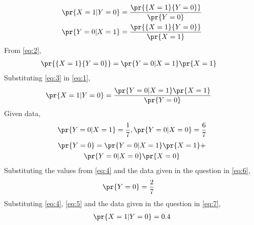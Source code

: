 \begin{align}
    \pr{X = 1|Y = 0}&=\frac{\pr{\{X=1\}\{Y=0\}}}{\pr{Y=0}} \label{eq:1}\\
    \pr{Y = 0|X = 1}&=\frac{\pr{\{X=1\}\{Y=0\}}}{\pr{X=1}} \label{eq:2}
\end{align}
From \eqref{eq:2},
\begin{align}
    \pr{\{X=1\}\{Y=0\}} &= \pr{Y = 0|X = 1}\pr{X=1} \label{eq:3}
\end{align}
Substituting \eqref{eq:3} in \eqref{eq:1},
\begin{align}
    \pr{X = 1|Y = 0} &= \frac{\pr{Y = 0|X = 1}\pr{X=1}}{\pr{Y=0}} \label{eq:7}
\end{align}
Given data,
\begin{align}
    \pr{Y = 0|X = 1} =\frac{1}{7}, \pr{Y =0|X=0}=\frac{6}{7} \label{eq:4}
\end{align}
\begin{multline}
    \pr{Y=0} = \pr{Y = 0|X = 1}\pr{X=1} +\\ \pr{Y = 0|X = 0}\pr{X=0} \label{eq:6}
\end{multline}
Substituting the values from \eqref{eq:4} and the data given in the question in \eqref{eq:6},
\begin{align}
    \pr{Y=0} &= \frac{2}{7} \label{eq:5}
\end{align}
Substituting \eqref{eq:4}, \eqref{eq:5} and the data given in the question in \eqref{eq:7},
\begin{align}
    \pr{X = 1|Y = 0} = 0.4
\end{align}

